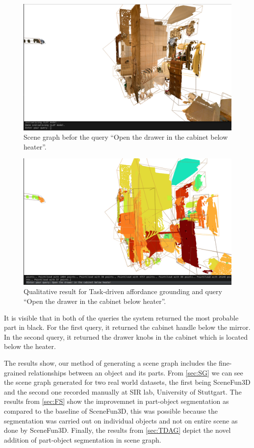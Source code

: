 \begin{figure}[ht!]
    \centering
    \includegraphics[width=\textwidth]{content/images/results/taskdrivenQ2.png}
    \caption{Scene graph befor the query \enquote{Open the drawer in the cabinet below heater}.}
    \label{fig:taskdrivenQ2}
\end{figure}
\begin{figure}[ht!]
    \centering
    \includegraphics[width=\textwidth]{content/images/results/taskdrivenA2.png}
    \caption{Qualitative result for Task-driven affordance grounding and query \enquote{Open the drawer in the cabinet below heater}.}
    \label{fig:taskdrivenA2}
\end{figure}

It is visible that in both of the queries the system returned the most probable part in black. For the first query, it returned the cabinet 
handle below the mirror. In the second query, it returned the drawer knobs in the cabinet which is located below the heater.


The results show, our method of generating a scene graph includes the fine-grained relationships between an object and its parts.
From \cref{sec:SG} we can see the scene graph generated for two real world datasets, the first being SceneFun3D and the second one recorded
manually at SIR lab, University of Stuttgart. The results from \cref{sec:FS} show the improvemnet in part-object segmentation as compared 
to the baseline of SceneFun3D, this was possible because the segmentation was carried out on individual objects and not on entire scene as done by
SceneFun3D. Finally, the results from \cref{sec:TDAG} depict the novel addition of part-object segmentation in scene graph.